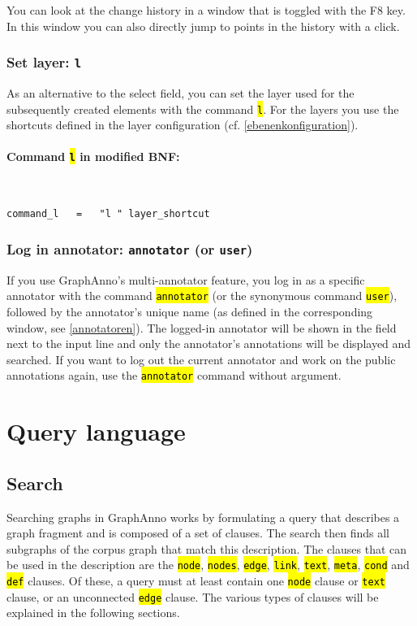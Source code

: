 \documentclass[12pt]{scrartcl}
\newcommand{\code}[1]{\hl{\texttt{#1}}}
\begin{document}
You can look at the change history in a window that is toggled with the F8 key.
In this window you can also directly jump to points in the history with a click.


\subsubsection{Set layer: \texttt{l}}\label{befehl-l}

As an alternative to the select field, you can set the layer used for the subsequently created elements with the command \code{l}.
For the layers you use the shortcuts defined in the layer configuration (cf. \ref{ebenenkonfiguration}).

\paragraph*{Command \code{l} in modified BNF:}
~
\begin{lstlisting}
command_l   =   "l " layer_shortcut
\end{lstlisting}



\subsubsection{Log in annotator: \texttt{annotator} (or \texttt{user})}

If you use GraphAnno’s multi-annotator feature, you log in as a specific annotator with the command \code{annotator} (or the synonymous command \code{user}), followed by the annotator’s unique name (as defined in the corresponding window, see \ref{annotatoren}).
The logged-in annotator will be shown in the field next to the input line and only the annotator’s annotations will be displayed and searched.
If you want to log out the current annotator and work on the public annotations again, use the \code{annotator} command without argument.






\section{Query language}

\subsection{Search}

Searching graphs in GraphAnno works by formulating a query that describes a graph fragment and is composed of a set of clauses.
The search then finds all subgraphs of the corpus graph that match this description.
The clauses that can be used in the description are the \code{node}, \code{nodes}, \code{edge}, \code{link}, \code{text}, \code{meta}, \code{cond} and \code{def} clauses.
Of these, a query must at least contain one \code{node} clause or \code{text} clause, or an unconnected \code{edge} clause.
The various types of clauses will be explained in the following sections.
\end{document}
